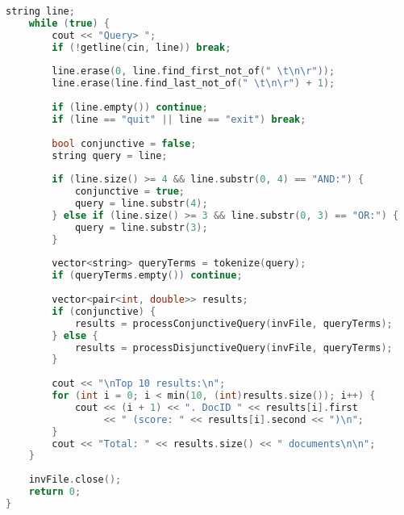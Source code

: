 \documentclass[11pt, a4paper]{report}
\begin{document}
\begin{lstlisting}[language=C++, caption={The complete source code for the query processor.}, label={lst:query}]
    string line;
    while (true) {
        cout << "Query> ";
        if (!getline(cin, line)) break;
        
        line.erase(0, line.find_first_not_of(" \t\n\r"));
        line.erase(line.find_last_not_of(" \t\n\r") + 1);
        
        if (line.empty()) continue;
        if (line == "quit" || line == "exit") break;
        
        bool conjunctive = false;
        string query = line;
        
        if (line.size() >= 4 && line.substr(0, 4) == "AND:") {
            conjunctive = true;
            query = line.substr(4);
        } else if (line.size() >= 3 && line.substr(0, 3) == "OR:") {
            query = line.substr(3);
        }
        
        vector<string> queryTerms = tokenize(query);
        if (queryTerms.empty()) continue;
        
        vector<pair<int, double>> results;
        if (conjunctive) {
            results = processConjunctiveQuery(invFile, queryTerms);
        } else {
            results = processDisjunctiveQuery(invFile, queryTerms);
        }
        
        cout << "\nTop 10 results:\n";
        for (int i = 0; i < min(10, (int)results.size()); i++) {
            cout << (i + 1) << ". DocID " << results[i].first 
                 << " (score: " << results[i].second << ")\n";
        }
        cout << "Total: " << results.size() << " documents\n\n";
    }
    
    invFile.close();
    return 0;
}
\end{lstlisting}
\end{document}
